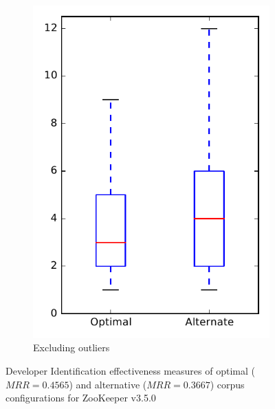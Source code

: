 \begin{figure}
\begin{subfigure}{.4\textwidth}
        \includegraphics[height=0.4\textheight]{figures/combo/dit_rq2_zookeeper_no_outlier}
        \caption{Excluding outliers}\label{fig:combo:dit:rq2:zookeeper_no_outlier}
    \end{subfigure}
\caption[Developer Identification effectiveness measures of optimal and alternative corpus configurations for ZooKeeper v3.5.0]%
{Developer Identification effectiveness measures of optimal ($MRR=0.4565$) and alternative ($MRR=0.3667$) corpus configurations for ZooKeeper v3.5.0}
\label{fig:combo:dit:rq2:zookeeper}
\end{figure}

